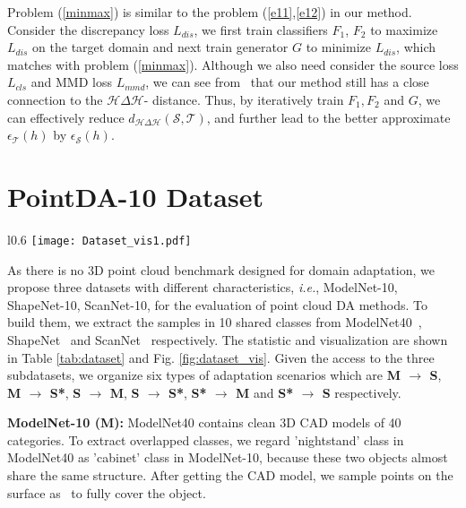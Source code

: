 \documentclass{article}
\newcommand*\ie{\textit{i.e.}}
\begin{document}
Problem (\ref{minmax}) is similar to the problem (\ref{e11},\ref{e12}) in our method. Consider the discrepancy loss $L_{dis}$, we first train classifiers $F_1$, $F_2$ to maximize $L_{dis}$ on the target domain and next train generator $G$ to minimize $L_{dis}$, which matches with problem (\ref{minmax}). Although we also need consider the source loss $L_{cls}$ and MMD loss $L_{mmd}$, we can see from~\cite{proof_conver1} that our method still has a close connection to the $\mathcal{H}\Delta\mathcal{H}$- distance. Thus, by iteratively train $F_1, F_2$ and $G$, we can effectively reduce $d_{\mathcal{H}\Delta\mathcal{H}}(\mathcal{S},\mathcal{T})$, and further lead to the better approximate $\epsilon_{\mathcal{T}}(h)$ by $\epsilon_{\mathcal{S}}(h)$.


\newpage
\section{PointDA-10 Dataset}

\begin{wrapfigure}{l}{0.6\textwidth}
\texttt{[image: Dataset\_vis1.pdf]}
\caption{Samples of PointDA-10 dataset.} 
\label{fig:dataset_vis}

\end{wrapfigure}
As there is no 3D point cloud benchmark designed for domain adaptation, we propose three datasets with different characteristics, \ie, ModelNet-10, ShapeNet-10, ScanNet-10, for the evaluation of point cloud DA methods. To build them, we extract the samples in 10 shared classes from  ModelNet40~\cite{wu20153d}, ShapeNet~\cite{chang2015shapenet} and ScanNet~\cite{dai2017scannet} respectively. The statistic and visualization are shown in Table \ref{tab:dataset} and Fig. \ref{fig:dataset_vis}. Given the access to the three subdatasets, we organize six types of adaptation scenarios which are \textbf{M $\rightarrow$ S}, \textbf{M $\rightarrow$ S*}, \textbf{S $\rightarrow$ M}, \textbf{S $\rightarrow$ S*}, \textbf{S* $\rightarrow$ M} and \textbf{S* $\rightarrow$ S} respectively.







\textbf{ModelNet-10 (M):} ModelNet40 contains clean 3D CAD models of 40 categories. To extract overlapped classes, we regard 'nightstand' class in ModelNet40 as 'cabinet' class in ModelNet-10, because these two objects almost share the same structure. After getting the CAD model, we sample points on the surface as~\cite{qi2017pointnet++} to fully cover the object.
\end{document}
